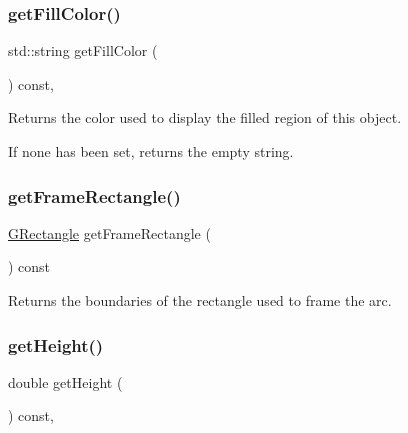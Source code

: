 \subsubsection{\texorpdfstring{get\+Fill\+Color()}{getFillColor()}}
{\footnotesize\ttfamily std\+::string get\+Fill\+Color (\begin{DoxyParamCaption}{ }\end{DoxyParamCaption}) const\hspace{0.3cm}{\ttfamily [virtual]}, {\ttfamily [inherited]}}



Returns the color used to display the filled region of this object. 

If none has been set, returns the empty string. \mbox{\label{classsgl_1_1GArc_aab1e594176fa66cc7bd50c1f77218428}} 
\subsubsection{\texorpdfstring{get\+Frame\+Rectangle()}{getFrameRectangle()}}
{\footnotesize\ttfamily \mbox{\hyperlink{structsgl_1_1GRectangle}{G\+Rectangle}} get\+Frame\+Rectangle (\begin{DoxyParamCaption}{ }\end{DoxyParamCaption}) const\hspace{0.3cm}{\ttfamily [virtual]}}



Returns the boundaries of the rectangle used to frame the arc. 

\mbox{\label{classsgl_1_1GObject_a1e7e353362434072875264cf95629f99}} 
\subsubsection{\texorpdfstring{get\+Height()}{getHeight()}}
{\footnotesize\ttfamily double get\+Height (\begin{DoxyParamCaption}{ }\end{DoxyParamCaption}) const\hspace{0.3cm}{\ttfamily [virtual]}, {\ttfamily [inherited]}}



